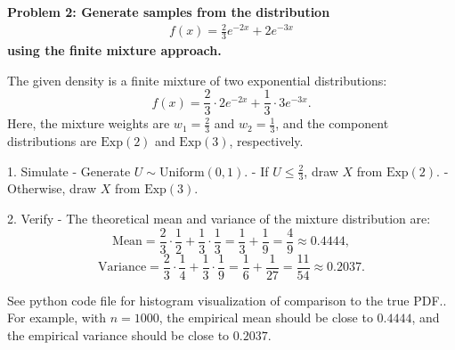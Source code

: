 \documentclass[12pt]{article}
\begin{document}
\begin{homeworkProblem}
\textbf{Problem 2: Generate samples from the distribution
\begin{gather}
    f(x) = \frac{2}{3}e^{-2x} + 2e^{-3x}
\end{gather}
using the finite mixture approach.}

\begin{solution}
The given density is a finite mixture of two exponential distributions:
\[
f(x) = \frac{2}{3} \cdot 2e^{-2x} + \frac{1}{3} \cdot 3e^{-3x}.
\]
Here, the mixture weights are \( w_1 = \frac{2}{3} \) and \( w_2 = \frac{1}{3} \), and the component distributions are \( \text{Exp}(2) \) and \( \text{Exp}(3) \), respectively.

1. Simulate
   - Generate \( U \sim \text{Uniform}(0,1) \).
   - If \( U \leq \frac{2}{3} \), draw \( X \) from \( \text{Exp}(2) \).
   - Otherwise, draw \( X \) from \( \text{Exp}(3) \).

2. Verify
   - The theoretical mean and variance of the mixture distribution are:
     \[
     \text{Mean} = \frac{2}{3} \cdot \frac{1}{2} + \frac{1}{3} \cdot \frac{1}{3} = \frac{1}{3} + \frac{1}{9} = \frac{4}{9} \approx 0.4444,
     \]
     \[
     \text{Variance} = \frac{2}{3} \cdot \frac{1}{4} + \frac{1}{3} \cdot \frac{1}{9} = \frac{1}{6} + \frac{1}{27} = \frac{11}{54} \approx 0.2037.
     \]

   See python code file for histogram visualization of comparison to the true PDF.. For example, with \( n = 1000 \), the empirical mean should be close to \( 0.4444 \), and the empirical variance should be close to \( 0.2037 \).
\end{solution}
\end{homeworkProblem}

\pagebreak
\end{document}
